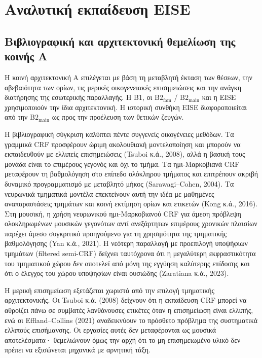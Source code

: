 \documentclass[11pt,a4paper]{article}
\begin{document}
\section{Αναλυτική εκπαίδευση EISE}\label{app:eise}

\subsection{Βιβλιογραφική και αρχιτεκτονική θεμελίωση της κοινής A}\label{app:eise-rationale}

Η κοινή αρχιτεκτονική A επιλέγεται με βάση τη μεταβλητή έκταση των θέσεων, την αβεβαιότητα των ορίων, τις μερικές οικογενειακές επισημειώσεις και την ανάγκη διατήρησης της εσωτερικής παραλλαγής. Η B1, οι $\mathrm{B2}_{\mathrm{fam}}$ / $\mathrm{B2}_{\mathrm{main}}$ και η EISE χρησιμοποιούν την ίδια αρχιτεκτονική. Η ιστορική συνθήκη EISE διαφοροποιείται από την $\mathrm{B2}_{\mathrm{main}}$ ως προς την προέλευση των θετικών ζευγών.

Η βιβλιογραφική σύγκριση καλύπτει πέντε συγγενείς οικογένειες μεθόδων. Τα γραμμικά CRF προσφέρουν ώριμη ακολουθιακή μοντελοποίηση και μπορούν να εκπαιδευθούν με ελλιπείς επισημειώσεις (Tsuboi κ.ά., 2008), αλλά η βασική τους μονάδα είναι το επιμέρους γεγονός και όχι το τμήμα. Τα ημι-Μαρκοβιανά CRF μεταφέρουν τη βαθμολόγηση στο επίπεδο ολόκληρου τμήματος και επιτρέπουν ακριβή δυναμικό προγραμματισμό με μεταβλητό μήκος (Sarawagi--Cohen, 2004). Τα νευρωνικά τμηματικά μοντέλα επεκτείνουν αυτή την ιδέα με μαθημένες αναπαραστάσεις τμημάτων και κοινή εκτίμηση ορίων και ετικετών (Kong κ.ά., 2016). Στη μουσική, η χρήση νευρωνικού ημι-Μαρκοβιανού CRF για άμεση πρόβλεψη ολοκληρωμένων μουσικών γεγονότων αντί ανεξάρτητων επιμέρους χρονικών πλαισίων παρέχει άμεσο συγκριτικό προηγούμενο για τη χρησιμότητα της τμηματικής βαθμολόγησης (Yan κ.ά., 2021). Η νεότερη παραλλαγή με προεπιλογή υποψήφιων τμημάτων (filtered semi-CRF) δείχνει ταυτόχρονα ότι η μεγαλύτερη εκφραστικότητα του τμηματικού χώρου δεν αποτελεί από μόνη της εγγύηση καλύτερης επίδοσης και ότι ο έλεγχος του χώρου υποψηφίων είναι ουσιώδης (Zaratiana κ.ά., 2023).

Η μερική επισημείωση εξετάζεται χωριστά από την επιλογή τμηματικής αρχιτεκτονικής. Οι Tsuboi κ.ά. (2008) δείχνουν ότι η εκπαίδευση CRF μπορεί να αθροίζει πάνω σε συμβατές λανθάνουσες ετικέτες όταν η επισημείωση είναι ελλιπής, ενώ οι Effland--Collins (2021) αναδεικνύουν το πρόσθετο πρόβλημα της συστηματικά ελλιπούς επισήμανσης. Οι εργασίες αυτές δεν μεταφέρονται ως μουσικά αποτελέσματα· θεμελιώνουν όμως την αρχή ότι το μη επισημειωμένο υλικό δεν πρέπει να εξισώνεται μηχανικά με αρνητική τάξη.
\end{document}
